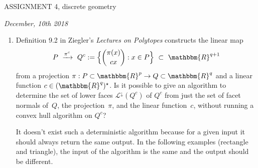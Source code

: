 \documentclass[12pt,a4paper]{article}
\newcommand{\RR}{\mathbbm{R}}
\begin{document}
\begin{center}{\Large{\sc ASSIGNMENT 4, discrete geometry }}\end{center}

\begin{center}{\textit{December, 10th 2018}}\end{center}

\begin{center}{
}\end{center}

\bigskip


\begin{enumerate}
\item Definition 9.2 in Ziegler's \emph{Lectures on Polytopes} constructs the linear map
  \[
    P
    \ \xrightarrow{\pi^c}\ 
    Q^c :=
    \Big\{ \binom{\pi(x)}{cx} : x\in P\Big\}
    \ \subset \
    \RR^{q+1}
  \]
  from a projection $\pi:P\subset\RR^p\to Q\subset\RR^q$ and a linear function $c\in(\RR^q)^\star$.
  Is it possible to give an algorithm to determine the set of lower faces $\mathcal L^\downarrow(Q^c)$ of $Q^c$ from just the set of facet normals of~$Q$, the projection~$\pi$, and the linear function~$c$, without running a convex hull algorithm on $Q^c$?
  
  \bigskip
  It doesn't exist such a deterministic algorithm because for a given input it should always return the same output. In the following examples (rectangle and triangle), the input of the algorithm is the same and the output should be different.
  

\end{enumerate}
\end{document}
